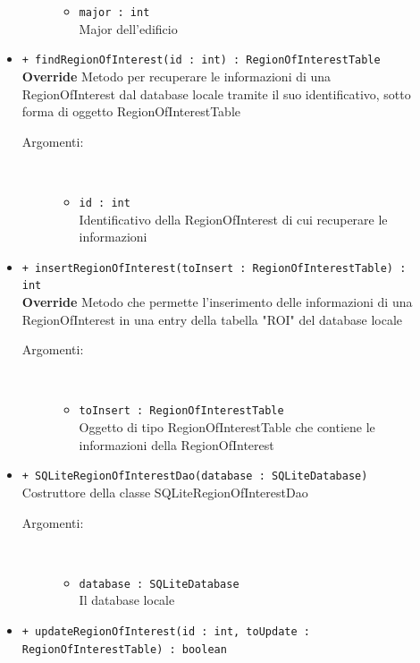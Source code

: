 \documentclass[../DefinizioneDiProdotto.tex]{subfiles}
\begin{document}
\begin{description}
\begin{itemize}
\begin{description}
\begin{itemize}
\item \texttt{major : int}\\
Major dell'edificio\end{itemize}
\end{description}
\item \texttt{+ findRegionOfInterest(id : int) : RegionOfInterestTable}\\
\textbf{Override} Metodo per recuperare le informazioni di una RegionOfInterest dal database locale tramite il suo identificativo, sotto forma di oggetto RegionOfInterestTable
 \begin{description}
\item[Argomenti:] \
\begin{itemize}
\item \texttt{id : int}\\
Identificativo della RegionOfInterest di cui recuperare le informazioni\end{itemize}
\end{description}
\item \texttt{+ insertRegionOfInterest(toInsert : RegionOfInterestTable) : int}\\
\textbf{Override} Metodo che permette l'inserimento delle informazioni di una RegionOfInterest in una entry della tabella "ROI" del database locale
 \begin{description}
\item[Argomenti:] \
\begin{itemize}
\item \texttt{toInsert : RegionOfInterestTable}\\
Oggetto di tipo RegionOfInterestTable che contiene le informazioni della RegionOfInterest\end{itemize}
\end{description}
\item \texttt{+ SQLiteRegionOfInterestDao(database : SQLiteDatabase)}\\
Costruttore della classe SQLiteRegionOfInterestDao
 \begin{description}
\item[Argomenti:] \
\begin{itemize}
\item \texttt{database : SQLiteDatabase}\\
Il database locale\end{itemize}
\end{description}
\item \texttt{+ updateRegionOfInterest(id : int, toUpdate : RegionOfInterestTable) : boolean}\\

\end{itemize}
\end{description}
\end{document}
